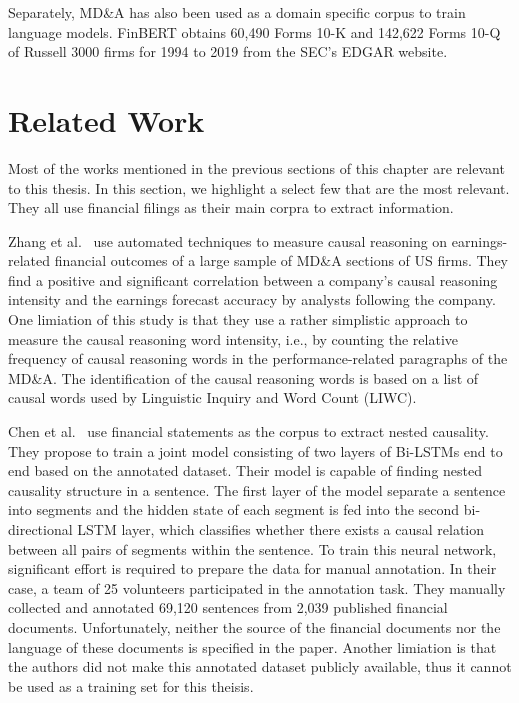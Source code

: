Separately, MD\&A has also been used as a domain specific corpus to train language models. FinBERT \cite{finBERT2020} obtains 60,490 Forms 10-K and 142,622 Forms 10-Q of Russell 3000 firms for 1994 to 2019 from the SEC's EDGAR website. 



\section{Related Work} \label{sec:related}
Most of the works mentioned in the previous sections of this chapter are relevant to this thesis. In this section, we highlight a select few that are the most relevant. They all use financial filings as their main corpra to extract information. 

Zhang et al.~\cite{Zhang2018} use automated techniques to measure causal reasoning on earnings-related financial outcomes of a large sample of MD\&A sections of US firms. They find a positive and significant correlation between a company's causal reasoning intensity and the earnings forecast accuracy by analysts following the company. One limiation of this study is that they use a rather simplistic approach to measure the causal reasoning word intensity, i.e., by counting the relative frequency of causal reasoning words in the performance-related paragraphs of the MD\&A. The identification of the causal reasoning words is based on a list of causal words used by Linguistic Inquiry and Word Count (LIWC). 

Chen et al.~\cite{Chen20} use financial statements as the corpus to extract nested causality. They propose to train a joint model consisting of two layers of Bi-LSTMs end to end based on the annotated dataset. Their model is capable of finding nested causality structure in a sentence. The first layer of the model separate a sentence into segments and the hidden state of each segment is fed into the second bi-directional LSTM layer, which classifies whether there exists a causal relation between all pairs of segments within the sentence. To train this neural network, significant effort is required to prepare the data for manual annotation. In their case, a team of 25 volunteers participated in the annotation task. They manually collected and annotated 69,120 sentences from 2,039 published financial documents. Unfortunately, neither the source of the financial documents nor the language of these documents is specified in the paper. Another limiation is that the authors did not make this annotated dataset publicly available, thus it cannot be used as a training set for this theisis. 

